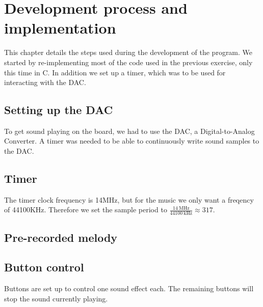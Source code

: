 \section{Development process and implementation}
\label{chap:development_process}

This chapter details the steps used during the development of the program.
We started by re-implementing most of the code used in the previous exercise, only this time in C.
In addition we set up a timer, which was to be used for interacting with the DAC.


\subsection{Setting up the DAC}

To get sound playing on the board, we had to use the DAC, a Digital-to-Analog Converter.
A timer was needed to be able to continuously write sound samples to the DAC.

\subsection{Timer}

The timer clock frequency is 14MHz, but for the music we only want a freqency of 44100KHz.
Therefore we set the sample period to $ \frac{\SI{14}{\mega\hertz}}{\SI{44100}{\kilo\hertz}} \approx 317 $.



\subsection{Pre-recorded melody}


\subsection{Button control}

Buttons are set up to control one sound effect each. The remaining buttons will stop the sound currently playing.
